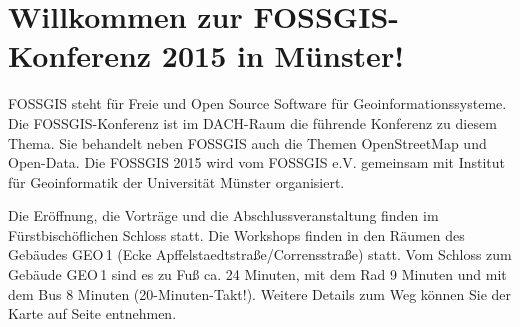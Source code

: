 \newpage
\section*{Willkommen zur FOSSGIS-Konferenz 2015 in Münster!} \label{welcome}
FOSSGIS steht für Freie und Open Source Software für Geoinformationssysteme. 
Die FOSSGIS-Konferenz ist im DACH-Raum die führende Konferenz zu diesem Thema. Sie behandelt neben
FOSSGIS auch die Themen OpenStreetMap und Open-Data.
Die FOSSGIS 2015 wird vom FOSSGIS e.V. gemeinsam mit Institut für Geoinformatik der 
Universität Münster organisiert.

Die Eröffnung, die Vorträge und die Abschlussveranstaltung finden im Fürstbischöflichen Schloss statt. 
Die Workshops finden in den Räumen des Gebäudes GEO\,1 (Ecke Apffelstaedtstraße/Corrensstraße) statt. Vom Schloss 
zum Gebäude GEO\,1 sind es zu Fuß ca. 24 Minuten, mit dem Rad 9 Minuten und mit dem Bus 8 Minuten (20-Minuten-Takt!).
Weitere Details zum Weg können Sie der Karte auf Seite  entnehmen.

\newpage

